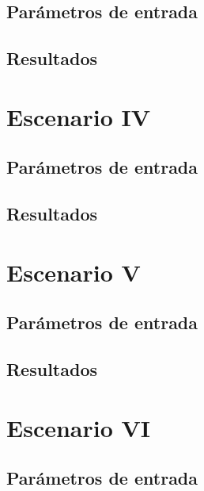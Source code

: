 \subsection{Parámetros de entrada}
\subsection{Resultados}


\section{Escenario IV}
\subsection{Parámetros de entrada}
\subsection{Resultados}


\section{Escenario V}
\subsection{Parámetros de entrada}
\subsection{Resultados}


\section{Escenario VI}
\subsection{Parámetros de entrada}
